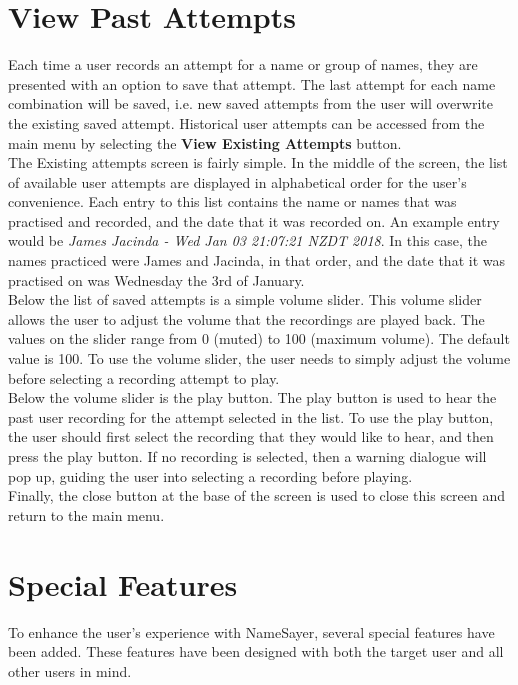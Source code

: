 \documentclass{article}
\begin{document}
\section{View Past Attempts}

Each time a user records an attempt for a name or group of names, they are
presented with an option to save that attempt. The last attempt for each name
combination will be saved, i.e. new saved attempts from the user will overwrite
the existing saved attempt. Historical user attempts can be accessed from the
main menu by selecting the \textbf{View Existing Attempts} button. \\

The Existing attempts screen is fairly simple. In the middle of the screen, the
list of available user attempts are displayed in alphabetical order for the
user's convenience. Each entry to this list contains the name or names that was
practised and recorded, and the date that it was recorded on. An example entry
would be {\em James Jacinda - Wed Jan 03 21:07:21 NZDT 2018}. In this case, the
names practiced were James and Jacinda, in that order, and the date that it was
practised on was Wednesday the 3rd of January. \\

Below the list of saved attempts is a simple volume slider. This volume slider
allows the user to adjust the volume that the  recordings are played back. The
values on the slider range from 0 (muted) to 100 (maximum volume). The default
value is 100. To use the  volume slider, the user needs to simply adjust the
volume before selecting a recording attempt to play. \\

Below the volume slider is the play button. The play button is used to hear the
past user recording for the attempt selected in the list. To use the play
button, the user should first select the recording that they would like to hear,
and then press the play button. If no recording is selected, then a warning
dialogue will pop up, guiding the user into selecting a recording  before
playing. \\

Finally, the close button at the base of the screen is used to close this screen
and return to the main menu.

\section{Special Features}
To enhance the user's experience with NameSayer, several special features have
been added. These features have been designed with both the target user and all
other users in mind.
\end{document}
